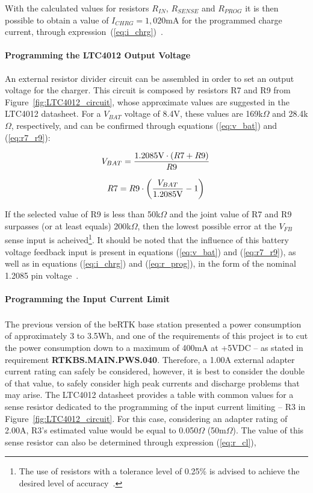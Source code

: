 With the calculated values for resistors $R_{IN}$, $R_{SENSE}$ and $R_{PROG}$ it is then possible to obtain a value of $I_{CHRG} = 1,020$mA for the programmed charge current, through expression~(\ref{eq:i_chrg})~\cite{LTC4012}.

\paragraph{Programming the LTC4012 Output Voltage}	An external resistor divider circuit can be assembled in order to set an output voltage for the charger. This circuit is composed by resistors R7 and R9 from Figure~\ref{fig:LTC4012_circuit}, whose approximate values are suggested in the LTC4012 datasheet. For a $V_{BAT}$ voltage of 8.4V, these values are 169k$\Omega$ and 28.4k$\Omega$, respectively, and can be confirmed through equations (\ref{eq:v_bat}) and (\ref{eq:r7_r9}):

\begin{equation}\label{eq:v_bat}
    V_{BAT}=\frac{1.2085\textrm{V} \cdot \left(R7 + R9\right)}{R9}\,\medskip
\end{equation}

\begin{equation}\label{eq:r7_r9}
    R7=R9 \cdot \left(\frac{V_{BAT}}{1.2085\textrm{V}} - 1\right)\,\medskip
\end{equation}

If the selected value of R9 is less than 50k$\Omega$ and the joint value of R7 and R9 surpasses (or at least equals) 200k$\Omega$, then the lowest possible error at the $V_{FB}$ sense input is acheived\footnote[10]{The use of resistors with a tolerance level of 0.25\% is advised to achieve the desired level of accuracy~\cite{LTC4012}.}. It should be noted that the influence of this battery voltage feedback input is present in equations (\ref{eq:v_bat}) and (\ref{eq:r7_r9}), as well as in equations (\ref{eq:i_chrg}) and (\ref{eq:r_prog}), in the form of the nominal 1.2085 pin voltage~\cite{LTC4012}.

\paragraph{Programming the Input Current Limit}	The previous version of the beRTK\textsuperscript{\textregistered} base station presented a power consumption of approximately 3 to 3.5Wh, and one of the requirements of this project is to cut the power consumption down to a maximum of 400mA at +5VDC -- as stated in requirement \textbf{RTKBS.MAIN.PWS.040}. Therefore, a 1.00A external adapter current rating can safely be considered, however, it is best to consider the double of that value, to safely consider high peak currents and discharge problems that may arise.
The LTC4012 datasheet provides a table with common values for a sense resistor dedicated to the programming of the input current limiting -- R3 in Figure~\ref{fig:LTC4012_circuit}. For this case, considering an adapter rating of 2.00A, R3's estimated value would be equal to 0.050$\Omega$ (50m$\Omega$). The value of this sense resistor can also be determined through expression (\ref{eq:r_cl}),

